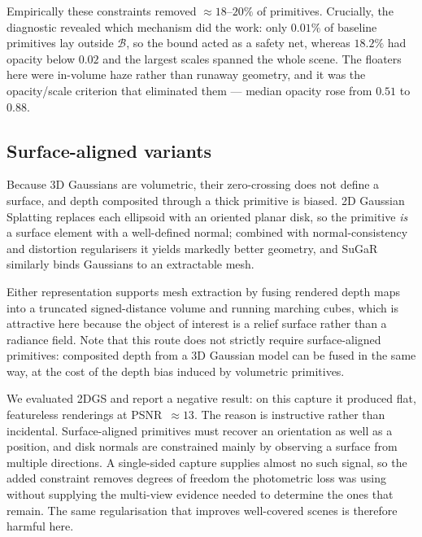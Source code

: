 Empirically these constraints removed $\approx\!18\text{--}20\%$ of primitives.
Crucially, the diagnostic revealed which mechanism did the work: only $0.01\%$ of
baseline primitives lay outside $\mathcal{B}$, so the bound acted as a safety net,
whereas $18.2\%$ had opacity below $0.02$ and the largest scales spanned the whole
scene. The floaters here were in-volume haze rather than runaway geometry, and it
was the opacity/scale criterion that eliminated them --- median opacity rose from
$0.51$ to $0.88$.

\subsection{Surface-aligned variants}
\label{sec:2dgs}

Because 3D Gaussians are volumetric, their zero-crossing does not define a
surface, and depth composited through a thick primitive is biased. 2D Gaussian
Splatting \cite{huang20242dgs} replaces each ellipsoid with an oriented planar
disk, so the primitive \emph{is} a surface element with a well-defined normal;
combined with normal-consistency and distortion regularisers it yields markedly
better geometry, and SuGaR \cite{guedon2024sugar} similarly binds Gaussians to an
extractable mesh.

Either representation supports mesh extraction by fusing rendered depth maps into
a truncated signed-distance volume \cite{curless1996tsdf} and running marching
cubes, which is attractive here because the object of interest is a relief surface
rather than a radiance field. Note that this route does not strictly require
surface-aligned primitives: composited depth from a 3D Gaussian model can be fused
in the same way, at the cost of the depth bias induced by volumetric primitives.

We evaluated 2DGS and report a negative result: on this capture it produced flat,
featureless renderings at PSNR~$\approx13$. The reason is instructive rather than
incidental. Surface-aligned primitives must recover an orientation as well as a
position, and disk normals are constrained mainly by observing a surface from
multiple directions. A single-sided capture supplies almost no such signal, so the
added constraint removes degrees of freedom the photometric loss was using without
supplying the multi-view evidence needed to determine the ones that remain. The
same regularisation that improves well-covered scenes is therefore harmful here.

